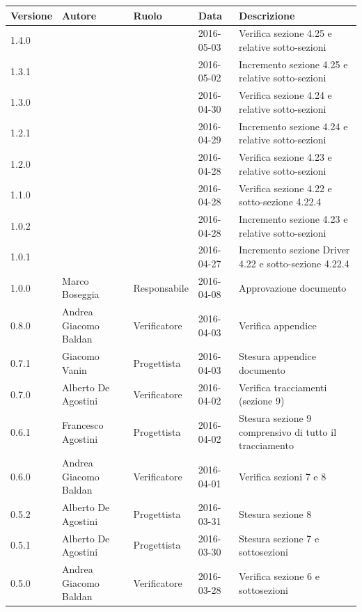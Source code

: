 \documentclass{scalatekids-article}
\begin{document}
\vspace{0cm}
\begin{center}
  \begin{longtable}{| l | l | l | l | p{5cm} |}
    \hline
    Versione & Autore & Ruolo & Data & Descrizione \\
    \hline
    1.4.0 & & & 2016-05-03 & Verifica sezione 4.25 e relative sotto-sezioni\\
    \hline
    1.3.1 & & & 2016-05-02 & Incremento sezione 4.25 e relative sotto-sezioni\\
    \hline
    1.3.0 & & & 2016-04-30 & Verifica sezione 4.24 e relative sotto-sezioni\\
    \hline
    1.2.1 & & & 2016-04-29 & Incremento sezione 4.24 e relative sotto-sezioni\\
    \hline
    1.2.0 & & & 2016-04-28 & Verifica sezione 4.23 e relative sotto-sezioni\\
    \hline
    1.1.0 & & & 2016-04-28 & Verifica sezione 4.22 e sotto-sezione 4.22.4\\
    \hline
    1.0.2 & & & 2016-04-28 & Incremento sezione 4.23 e relative sotto-sezioni\\
    \hline
    1.0.1 & & & 2016-04-27 & Incremento sezione Driver 4.22 e sotto-sezione 4.22.4\\
\hline
    1.0.0 & Marco Boseggia & Responsabile & 2016-04-08 & Approvazione documento\\
    \hline
    0.8.0 & Andrea Giacomo Baldan & Verificatore & 2016-04-03 & Verifica appendice\\
    \hline
    0.7.1 & Giacomo Vanin & Progettista & 2016-04-03 & Stesura appendice documento\\
    \hline
    0.7.0 & Alberto De Agostini & Verificatore & 2016-04-02 & Verifica tracciamenti (sezione 9)\\
    \hline
    0.6.1 & Francesco Agostini & Progettista & 2016-04-02 & Stesura sezione 9 comprensivo di tutto il tracciamento\\
    \hline
    0.6.0 & Andrea Giacomo Baldan & Verificatore & 2016-04-01 & Verifica sezioni 7 e 8 \\
    \hline
    0.5.2 & Alberto De Agostini & Progettista & 2016-03-31 & Stesura sezione 8\\
    \hline
    0.5.1 & Alberto De Agostini & Progettista & 2016-03-30 & Stesura sezione 7 e sottosezioni\\
    \hline
    0.5.0 & Andrea Giacomo Baldan & Verificatore & 2016-03-28 & Verifica sezione 6 e sottosezioni\\

\end{longtable}
\end{center}
\end{document}
